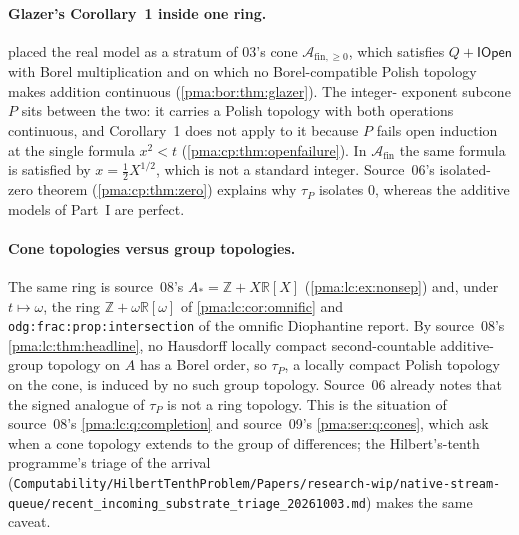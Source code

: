 \documentclass[11pt]{article}
\numberwithin{equation}{section}
\theoremstyle{definition}
\theoremstyle{remark}
\newcommand{\Z}{\mathbb Z}
\newcommand{\R}{\mathbb R}
\newcommand{\IOpen}{\mathsf{IOpen}}
\newcommand{\A}{\mathcal A_{\mathrm{fin}}}
\newcommand{\PP}{\mathcal A_{\mathrm{fin},\geq 0}}
\newcommand{\replabel}[1]{\nolinkurl{#1}}
\newcommand{\fn}[1]{\nolinkurl{#1}}
\begin{document}
\paragraph{Glazer's Corollary~1 inside one ring.} 
placed the real model as a stratum of 03's cone $\PP$, which satisfies
$Q+\IOpen$ with Borel multiplication and on which no Borel-compatible Polish
topology makes addition continuous (\cref{pma:bor:thm:glazer}). The integer-
exponent subcone $P$ sits between the two: it carries a Polish topology with
both operations continuous, and Corollary~1 does not apply to it because $P$
fails open induction at the single formula $x^2<t$
(\cref{pma:cp:thm:openfailure}). In $\A$ the same formula is satisfied by
$x=\tfrac12X^{1/2}$, which is not a standard integer. Source~06's
isolated-zero theorem (\cref{pma:cp:thm:zero}) explains why $\tau_P$ isolates
$0$, whereas the additive models of Part~I are perfect.

\paragraph{Cone topologies versus group topologies.} The same ring is
source~08's $A_*=\Z+X\R[X]$ (\cref{pma:lc:ex:nonsep}) and, under
$t\mapsto\omega$, the ring $\Z+\omega\R[\omega]$ of \cref{pma:lc:cor:omnific}
and \replabel{odg:frac:prop:intersection} of the omnific Diophantine report.
By source~08's \cref{pma:lc:thm:headline}, no Hausdorff locally compact
second-countable additive-group topology on $A$ has a Borel order, so
$\tau_P$, a locally compact Polish topology on the cone, is induced by no
such group topology. Source~06 already notes that the signed analogue of
$\tau_P$ is not a ring topology. This is the situation of source~08's
\cref{pma:lc:q:completion} and source~09's \cref{pma:ser:q:cones}, which ask
when a cone topology extends to the group of differences; the Hilbert's-tenth
programme's triage of the arrival
(\fn{Computability/HilbertTenthProblem/Papers/research-wip/native-stream-queue/recent_incoming_substrate_triage_20261003.md})
makes the same caveat.
\end{document}
